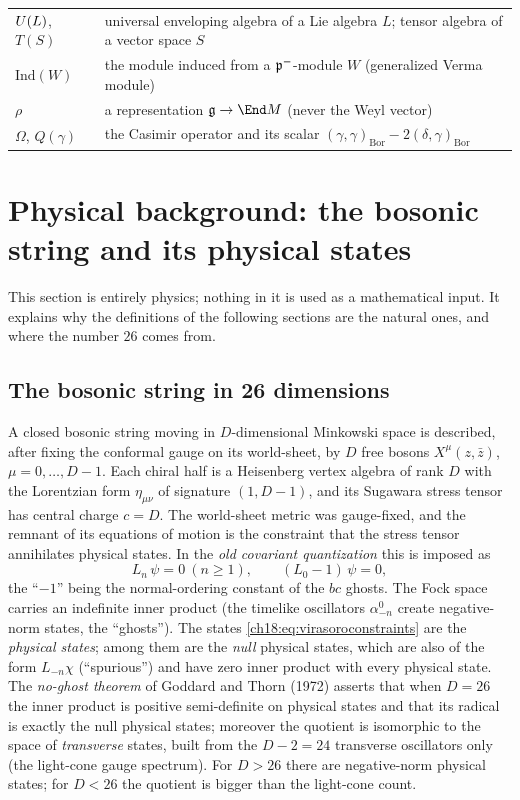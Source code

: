 \begin{longtable}{p{}p{}}
$\mathcal \mathcal U(L)$, $T(S)$ & universal enveloping algebra of a Lie algebra $L$; tensor algebra of a vector space $S$\\
$\mathrm{Ind}(W)$ & the module induced from a $\mathfrak{p}^-$-module $W$ (generalized Verma module)\\
$\rho$ & a representation $\chXVIIIg\to\End M$ (never the Weyl vector)\\
$\Omega$, $Q(\gamma)$ & the Casimir operator and its scalar $(\gamma,\gamma)_{\mathrm{Bor}}-2(\delta,\gamma)_{\mathrm{Bor}}$\\
\bottomrule
\end{longtable}

\section{Physical background: the bosonic string and its physical states}\label{ch18:sec:physics}

This section is entirely physics; nothing in it is used as a mathematical input.  It explains why the
definitions of the following sections are the natural ones, and where the number $26$ comes from.

\subsection{The bosonic string in 26 dimensions}

A closed bosonic string moving in $D$-dimensional Minkowski space is described, after fixing the
conformal gauge on its world-sheet, by $D$ free bosons $X^\mu(z,\bar z)$, $\mu=0,\dots,D-1$.  Each
chiral half is a Heisenberg vertex algebra of rank $D$ with the Lorentzian form $\eta_{\mu\nu}$ of
signature $(1,D-1)$, and its Sugawara stress tensor has central charge $c=D$.  The world-sheet metric
was gauge-fixed, and the remnant of its equations of motion is the constraint that the stress tensor
annihilates physical states.  In the \emph{old covariant quantization} this is imposed as
\begin{equation}\label{ch18:eq:virasoroconstraints}
  L_n\,\psi = 0\ (n\ge1),\qquad (L_0-1)\,\psi=0,
\end{equation}
the ``$-1$'' being the normal-ordering constant of the $bc$ ghosts.  The Fock space carries an
indefinite inner product (the timelike oscillators $\alpha^0_{-n}$ create negative-norm states, the
``ghosts'').  The states \eqref{ch18:eq:virasoroconstraints} are the \emph{physical states}; among them
are the \emph{null} physical states, which are also of the form $L_{-n}\chi$ (``spurious'') and have
zero inner product with every physical state.  The \emph{no-ghost theorem} of Goddard and Thorn (1972)
asserts that when $D=26$ the inner product is positive semi-definite on physical states and that its
radical is exactly the null physical states; moreover the quotient is isomorphic to the space of
\emph{transverse} states, built from the $D-2=24$ transverse oscillators only (the light-cone gauge
spectrum).  For $D>26$ there are negative-norm physical states; for $D<26$ the quotient is bigger than
the light-cone count.

